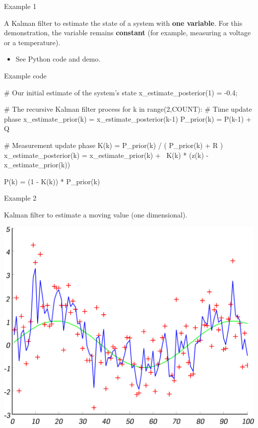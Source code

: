 \documentclass[compress]{beamer}
\begin{document}
\begin{frame}{Example 1}

A Kalman filter to estimate the state of a system with \textbf{one
variable}. For this demonstration, the variable remains
\textbf{constant} (for example, measuring a voltage or a temperature).

\begin{itemize}
    \item See Python code and demo.
\end{itemize}

\end{frame}

\begin{frame}[fragile]{Example code}

    \begin{pythoncode}

# Our initial estimate of the system's state
x_estimate_posterior(1) = -0.4;

# The recursive Kalman filter process
for k in range(2,COUNT):
    # Time update phase
    x_estimate_prior(k) = x_estimate_posterior(k-1)
    P_prior(k) = P(k-1) + Q

    # Measurement update phase
    K(k) = P_prior(k) / ( P_prior(k) + R )
    x_estimate_posterior(k) = x_estimate_prior(k) + \
                  K(k) * (z(k) - x_estimate_prior(k))

    P(k) = (1 - K(k)) * P_prior(k)
    \end{pythoncode}

\end{frame}


\begin{frame}{Example 2}

  Kalman filter to estimate a moving value (one dimensional).

        \begin{center}
            \includegraphics[width=0.7\linewidth]{kalman2}
        \end{center}

\end{frame}
\end{document}
